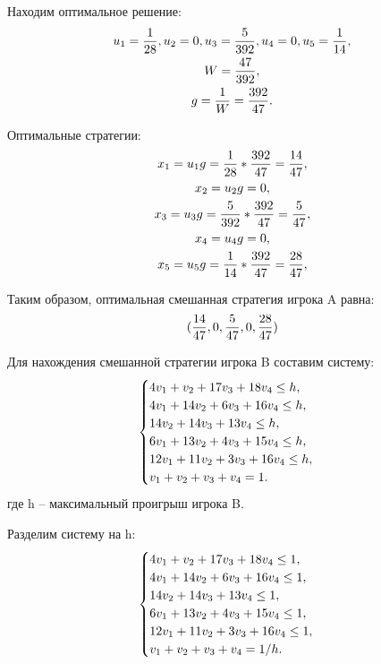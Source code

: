 \documentclass[12pt,a4paper,oneside]{extarticle}
\begin{document}

    Находим оптимальное решение:
    \begin{gather}
        u_1 = \frac{1}{28}, u_2 = 0, u_3 = \frac{5}{392}, u_4 = 0, u_5 = \frac{1}{14}, \notag \\
        W = \frac{47}{392}, \notag \\
        g = \frac{1}{W} = \frac{392}{47}. \notag
    \end{gather}

    Оптимальные стратегии:
    \begin{gather}
        x_1 = u_1g = \frac{1}{28} * \frac{392}{47} = \frac{14}{47}, \notag \\
        x_2 = u_2g = 0, \notag \\
        x_3 = u_3g =\frac{5}{392} * \frac{392}{47} = \frac{5}{47}, \notag \\
        x_4 = u_4g = 0, \notag \\
        x_5 = u_5g = \frac{1}{14} * \frac{392}{47} =\frac{28}{47}, \notag
    \end{gather}

    Таким образом, оптимальная смешанная стратегия игрока A равна:
    \begin{gather}
        (\frac{14}{47}, 0, \frac{5}{47}, 0, \frac{28}{47}) \notag
    \end{gather}

    
    Для нахождения смешанной стратегии игрока B составим систему:
    \begin{gather}
        \begin{cases}
            4v_1 + v_2 + 17v_3 + 18v_4 \leq h, \notag \\
            4v_1 + 14v_2 + 6v_3 + 16v_4 \leq h, \notag \\
            14v_2 + 14v_3 + 13v_4 \leq h, \notag \\
            6v_1 + 13v_2 + 4v_3 + 15v_4  \leq h, \notag \\
            12v_1 + 11v_2 + 3v_3 + 16v_4  \leq h, \notag \\
            v_1+v_2+v_3+v_4=1. \notag
        \end{cases} \notag
    \end{gather} 
    где h – максимальный проигрыш игрока B.

    Разделим систему на h:
    \begin{gather}
        \begin{cases}
            4v_1 + v_2 + 17v_3 + 18v_4 \leq 1, \notag \\
            4v_1 + 14v_2 + 6v_3 + 16v_4 \leq 1, \notag \\
            14v_2 + 14v_3 + 13v_4 \leq 1, \notag \\
            6v_1 + 13v_2 + 4v_3 + 15v_4  \leq 1, \notag \\
            12v_1 + 11v_2 + 3v_3 + 16v_4  \leq 1, \notag \\
            v_1+v_2+v_3+v_4=1/h.
        \end{cases} \notag
    \end{gather}
\end{document}

